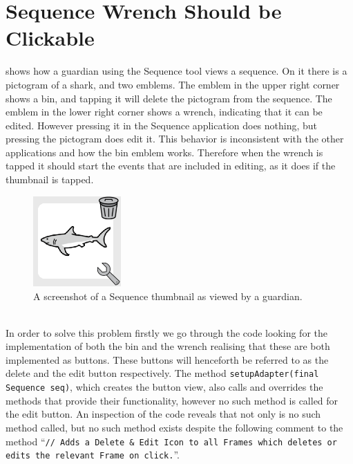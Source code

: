 \section{Sequence Wrench Should be Clickable}
\begin{center}
\end{center}

 shows how a guardian using the Sequence tool views a sequence.
On it there is a pictogram of a shark, and two emblems.
The emblem in the upper right corner shows a bin, and tapping it will delete the pictogram from the sequence.
The emblem in the lower right corner shows a wrench, indicating that it can be edited.
However pressing it in the Sequence application does nothing, but pressing the pictogram does edit it.
This behavior is inconsistent with the other applications and how the bin emblem works.
Therefore when the wrench is tapped it should start the events that are included in editing, as it does if the thumbnail is tapped.
\begin{figure}
    \centering
    \includegraphics[width=0.3\textwidth]{figures/img/screenshots/Sequence_pictogram.png}
    \caption{A screenshot of a Sequence thumbnail as viewed by a guardian.}\label{fig:seq_wrench}
\end{figure}
\\
In order to solve this problem firstly we go through the code looking for the implementation of both the bin and the wrench realising that these are both implemented as buttons.
These buttons will henceforth be referred to as the delete and the edit button respectively.
The method \texttt{setupAdapter(final Sequence seq)}, which creates the button view, also calls and overrides the methods that provide their functionality, however no such method is called for the edit button.
An inspection of the code reveals that not only is no such method called, but no such method exists despite the following comment to the method \enquote{\texttt{// Adds a Delete \& Edit Icon to all Frames which deletes or edits the relevant Frame on click.}}.


